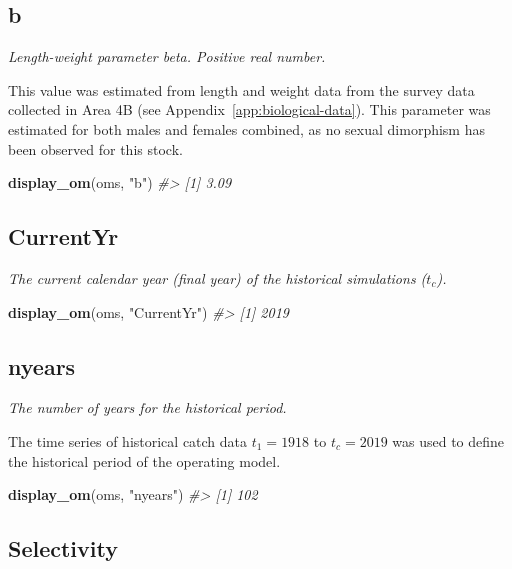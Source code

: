 \documentclass[11pt]{book}
\newenvironment{Shaded}{}{}
\newcommand{\KeywordTok}[1]{\textcolor[rgb]{0.00,0.44,0.13}{\textbf{{#1}}}}
\newcommand{\StringTok}[1]{\textcolor[rgb]{0.25,0.44,0.63}{{#1}}}
\newcommand{\CommentTok}[1]{\textcolor[rgb]{0.38,0.63,0.69}{\textit{{#1}}}}
\newcommand{\NormalTok}[1]{{#1}}
\begin{document}
\subsection{b}

\emph{Length-weight parameter beta. Positive real number.}

This value was estimated from length and weight data from the survey data collected in Area 4B (see Appendix~\ref{app:biological-data}). This parameter was estimated for both males and females combined, as no sexual dimorphism has been observed for this stock.
\begin{Shaded}
\begin{Highlighting}[]
\KeywordTok{display_om}\NormalTok{(oms, }\StringTok{"b"}\NormalTok{)}
\CommentTok{#> [1] 3.09}
\end{Highlighting}
\end{Shaded}
\label{app:desc-fleet-yelloweye}

\label{app:desc-fleet-currentyr-yelloweye}
\subsection{CurrentYr}

\emph{The current calendar year (final year) of the historical simulations (\(t_c\)).}
\begin{Shaded}
\begin{Highlighting}[]
\KeywordTok{display_om}\NormalTok{(oms, }\StringTok{"CurrentYr"}\NormalTok{)}
\CommentTok{#> [1] 2019}
\end{Highlighting}
\end{Shaded}
\label{app:desc-fleet-nyears-yelloweye}
\subsection{nyears}

\emph{The number of years for the historical period.}

The time series of historical catch data \(t_1 = 1918\) to \(t_c = 2019\) was used to define the historical period of the operating model.
\begin{Shaded}
\begin{Highlighting}[]
\KeywordTok{display_om}\NormalTok{(oms, }\StringTok{"nyears"}\NormalTok{)}
\CommentTok{#> [1] 102}
\end{Highlighting}
\end{Shaded}
\label{app:desc-fleet-selectivity-yelloweye}
\subsection{Selectivity}
\end{document}
